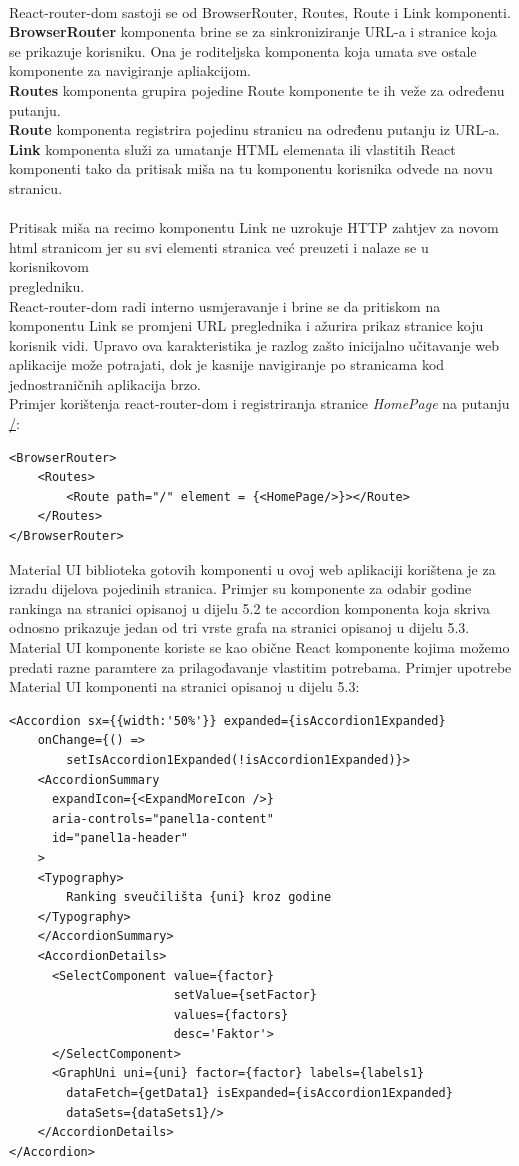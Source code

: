 \documentclass[times, utf8, zavrsni]{fer}
\begin{document}
\\React-router-dom sastoji se od BrowserRouter, Routes, Route i Link komponenti. 
\\\textbf{BrowserRouter} komponenta brine se za sinkroniziranje URL-a i stranice koja se prikazuje korisniku. Ona je roditeljska komponenta koja umata sve ostale komponente za navigiranje apliakcijom.
\\\textbf{Routes} komponenta grupira pojedine Route komponente te ih veže za određenu putanju.
\\\textbf{Route} komponenta registrira pojedinu stranicu na određenu putanju iz URL-a.
\\\textbf{Link} komponenta služi za umatanje HTML elemenata ili vlastitih React komponenti tako da pritisak miša na tu komponentu korisnika odvede na novu stranicu.
\\\\Pritisak miša na recimo komponentu Link ne uzrokuje HTTP zahtjev za novom html stranicom jer su svi elementi stranica već preuzeti i nalaze se u korisnikovom \\pregledniku.
\\React-router-dom radi interno usmjeravanje i brine se da pritiskom na komponentu Link se promjeni URL preglednika i ažurira prikaz stranice koju korisnik vidi.
Upravo ova karakteristika je razlog zašto inicijalno učitavanje web aplikacije može potrajati, dok je kasnije navigiranje po stranicama kod jednostraničnih aplikacija brzo.
\\Primjer korištenja react-router-dom i registriranja stranice \emph{HomePage} na putanju \url{/}:
\begin{verbatim}
<BrowserRouter>
    <Routes>
        <Route path="/" element = {<HomePage/>}></Route>
    </Routes>
</BrowserRouter>
\end{verbatim}
Material UI biblioteka gotovih komponenti u ovoj web aplikaciji korištena je za izradu dijelova pojedinih stranica. Primjer su komponente za odabir godine rankinga
na stranici opisanoj u dijelu 5.2 te accordion komponenta koja skriva odnosno prikazuje jedan od tri vrste grafa na stranici opisanoj u dijelu 5.3.
Material UI komponente koriste se kao obične React komponente kojima možemo predati razne paramtere za prilagođavanje vlastitim potrebama.
Primjer upotrebe Material UI komponenti na stranici opisanoj u dijelu 5.3:
\begin{verbatim}
<Accordion sx={{width:'50%'}} expanded={isAccordion1Expanded} 
    onChange={() => 
        setIsAccordion1Expanded(!isAccordion1Expanded)}>
    <AccordionSummary
      expandIcon={<ExpandMoreIcon />}
      aria-controls="panel1a-content"
      id="panel1a-header"
    >
    <Typography>
        Ranking sveučilišta {uni} kroz godine
    </Typography>
    </AccordionSummary>
    <AccordionDetails>
      <SelectComponent value={factor} 
                       setValue={setFactor} 
                       values={factors} 
                       desc='Faktor'>
      </SelectComponent>
      <GraphUni uni={uni} factor={factor} labels={labels1} 
        dataFetch={getData1} isExpanded={isAccordion1Expanded} 
        dataSets={dataSets1}/>
    </AccordionDetails>
</Accordion>
\end{verbatim}
\end{document}
